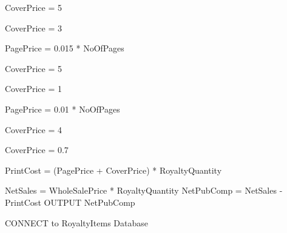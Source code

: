 \begin{algorithm}[H]
\begin{algorithmic}[1]
        CoverPrice = 5
   
    \EndIf    


        CoverPrice = 3

    \EndIf

\EndIf



        PagePrice = 0.015 * NoOfPages

            
            CoverPrice = 5

        \EndIf

            
            CoverPrice = 1
    
        \EndIf   

    \EndIf
 

        PagePrice = 0.01 * NoOfPages

            
            CoverPrice = 4      

        \EndIf

            CoverPrice = 0.7

        \EndIf    
        
    \EndIf

\EndIf

PrintCost = (PagePrice + CoverPrice) * RoyaltyQuantity


    NetSales = WholeSalePrice * RoyaltyQuantity
    NetPubComp = NetSales - PrintCost
    OUTPUT NetPubComp

\EndIf

    
    CONNECT to RoyaltyItems Database
    
\EndIf

\EndFunction

\end{algorithmic}
\end{algorithm}


